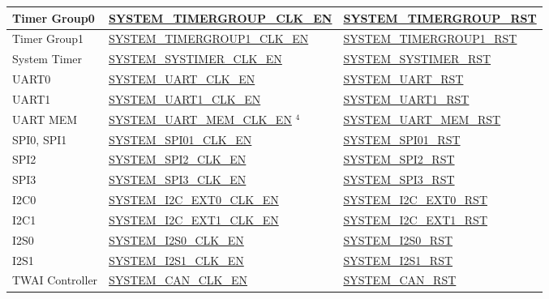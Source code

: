 \documentclass[main\_\_EN.tex]{subfiles}
\begin{document}
\begin{longtable}[c]{ |p{4cm}|p{6cm}|p{6cm}| }
Timer Group0    & \hyperref[fielddesc:SYSTEMTIMERGROUPCLKEN]{SYSTEM\_TIMERGROUP\_CLK\_EN} & \hyperref[fielddesc:SYSTEMTIMERGROUPRST]{SYSTEM\_TIMERGROUP\_RST} \\\hline
Timer Group1    & \hyperref[fielddesc:SYSTEMTIMERGROUP1CLKEN]{SYSTEM\_TIMERGROUP1\_CLK\_EN} & \hyperref[fielddesc:SYSTEMTIMERGROUP1RST]{SYSTEM\_TIMERGROUP1\_RST} \\\hline
System Timer    & \hyperref[fielddesc:SYSTEMSYSTIMERCLKEN]{SYSTEM\_SYSTIMER\_CLK\_EN} & \hyperref[fielddesc:SYSTEMSYSTIMERRST]{SYSTEM\_SYSTIMER\_RST} \\\hline
UART0    & \hyperref[fielddesc:SYSTEMUARTCLKEN]{SYSTEM\_UART\_CLK\_EN} & \hyperref[fielddesc:SYSTEMUARTRST]{SYSTEM\_UART\_RST} \\\hline
UART1    & \hyperref[fielddesc:SYSTEMUART1CLKEN]{SYSTEM\_UART1\_CLK\_EN} & \hyperref[fielddesc:SYSTEMUART1RST]{SYSTEM\_UART1\_RST} \\\hline
UART MEM    & \hyperref[fielddesc:SYSTEMUARTMEMCLKEN]{SYSTEM\_UART\_MEM\_CLK\_EN} {\hyperref[other:sysreg-reset-notes]{$^4$}} & \hyperref[fielddesc:SYSTEMUARTMEMRST]{SYSTEM\_UART\_MEM\_RST} \\\hline
SPI0, SPI1    & \hyperref[fielddesc:SYSTEMSPI01CLKEN]{SYSTEM\_SPI01\_CLK\_EN} & \hyperref[fielddesc:SYSTEMSPI01RST]{SYSTEM\_SPI01\_RST} \\\hline
SPI2    & \hyperref[fielddesc:SYSTEMSPI2CLKEN]{SYSTEM\_SPI2\_CLK\_EN} & \hyperref[fielddesc:SYSTEMSPI2RST]{SYSTEM\_SPI2\_RST} \\\hline
SPI3    & \hyperref[fielddesc:SYSTEMSPI3CLKEN]{SYSTEM\_SPI3\_CLK\_EN} & \hyperref[fielddesc:SYSTEMSPI3RST]{SYSTEM\_SPI3\_RST} \\\hline
I2C0    & \hyperref[fielddesc:SYSTEMI2CEXT0CLKEN]{SYSTEM\_I2C\_EXT0\_CLK\_EN} & \hyperref[fielddesc:SYSTEMI2CEXT0RST]{SYSTEM\_I2C\_EXT0\_RST} \\\hline
I2C1    & \hyperref[fielddesc:SYSTEMI2CEXT1CLKEN]{SYSTEM\_I2C\_EXT1\_CLK\_EN} & \hyperref[fielddesc:SYSTEMI2CEXT1RST]{SYSTEM\_I2C\_EXT1\_RST} \\\hline
I2S0    & \hyperref[fielddesc:SYSTEMI2S0CLKEN]{SYSTEM\_I2S0\_CLK\_EN} & \hyperref[fielddesc:SYSTEMI2S0RST]{SYSTEM\_I2S0\_RST} \\\hline
I2S1    & \hyperref[fielddesc:SYSTEMI2S1CLKEN]{SYSTEM\_I2S1\_CLK\_EN} & \hyperref[fielddesc:SYSTEMI2S1RST]{SYSTEM\_I2S1\_RST} \\\hline
TWAI Controller    & \hyperref[fielddesc:SYSTEMCANCLKEN]{SYSTEM\_CAN\_CLK\_EN} & \hyperref[fielddesc:SYSTEMCANRST]{SYSTEM\_CAN\_RST} \\\hline

\end{longtable}
\end{document}
